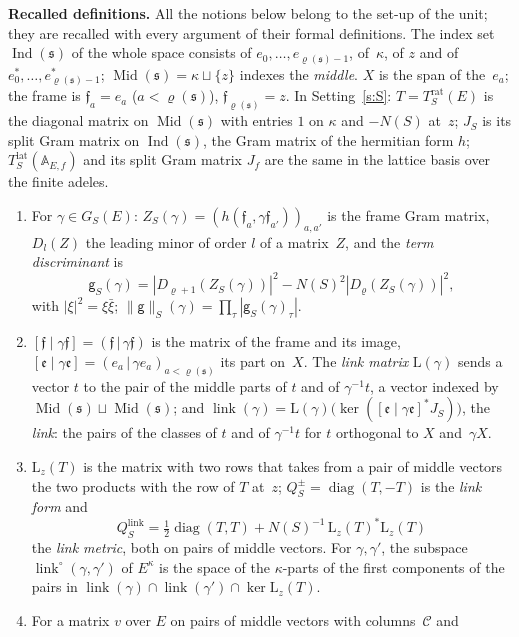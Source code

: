 \documentclass[11pt,a4paper]{article}
\newcommand{\diag}{\operatorname{diag}}
\newcommand{\m}[1]{\mbox{$#1$}}        %
\newcommand{\subhead}[1]{\par\addvspace{9pt plus 2pt}\Needspace{4\baselineskip}\noindent\textbf{#1}\enspace\ignorespaces}
\theoremstyle{plainx}
\theoremstyle{uprightx}
\newcommand{\fs}{\mathfrak{s}}                      %
\newcommand{\AEf}{\mathbb{A}_{E,f}}
\newcommand{\rh}[1]{\varrho(#1)}                    %
\newcommand{\Ix}[1]{\operatorname{Ind}(#1)}                          %
\newcommand{\Mx}[1]{\operatorname{Mid}(#1)}                          %
\newcommand{\NS}[1]{N(#1)}                          %
\newcommand{\Trat}[2]{T^{\mathrm{rat}}_{#1}(#2)}    %
\newcommand{\Tlat}[2]{T^{\mathrm{lat}}_{#1}(#2)}    %
\newcommand{\GS}[2]{G_{#1}(#2)}                     %
\newcommand{\Zf}[2]{Z_{#1}(#2)}                     %
\newcommand{\tdisc}[2]{\mathsf{g}_{#1}(#2)}         %
\newcommand{\link}[1]{\operatorname{link}(#1)}      %
\newcommand{\clink}[2]{\operatorname{link}^{\circ}(#1,#2)} %
\newcommand{\tdnorm}[2]{\|\mathsf{g}\|_{#1}(#2)}    %
\newcommand{\lmet}[1]{Q^{\mathrm{link}}_{#1}}       %
\newcommand{\Jrat}[1]{J_{#1}}                         %
\newcommand{\fpair}[1]{[\mathfrak{f}\mid #1\mathfrak{f}]}   %
\newcommand{\ifp}[1]{[\mathfrak{e}\mid #1\mathfrak{e}]}     %
\newcommand{\lmat}[1]{\mathrm{L}(#1)}                 %
\newcommand{\zp}[1]{\mathrm{L}_{z}(#1)}               %
\newcommand{\lform}[1]{Q^{\pm}_{#1}}                  %
\newcommand{\lminor}[2]{D_{#2}(#1)}                   %
\begin{document}
\subhead{Recalled definitions.} All the notions below belong to the set-up of the unit; they are recalled with
every argument of their formal definitions. The index set \m{\Ix{\fs}} of the whole space consists of
\m{e_0,\dots,e_{\rh{\fs}-1}}, of~$\kappa$, of $z$ and of \m{e^*_0,\dots,e^*_{\rh{\fs}-1}}; \m{\Mx{\fs}=\kappa\sqcup\{z\}}
indexes the \emph{middle}. $X$ is the span of the~$e_a$; the frame is \m{\mathfrak f_a=e_a} (\m{a<\rh{\fs}}),
\m{\mathfrak f_{\rh{\fs}}=z}. In Setting~\ref{s:S}: \m{T=\Trat{S}{E}} is the diagonal matrix on \m{\Mx{\fs}} with
entries $1$ on $\kappa$ and \m{-\NS{S}} at~$z$; \m{\Jrat{S}} is its split Gram matrix on \m{\Ix{\fs}}, the Gram
matrix of the hermitian form $h$; \m{\Tlat{S}{\AEf}} and its split Gram matrix $J_f$ are the same in the lattice
basis over the finite adeles.
\begin{enumerate}[label=\textup{(\alph*)},leftmargin=2.3em,itemsep=2pt]
\item For \m{\gamma\in\GS{S}{E}}: $\Zf{S}{\gamma}=(h(\mathfrak f_a,\gamma\mathfrak f_{a'}))_{a,a'}$ is the frame Gram
matrix, \m{\lminor{Z}{l}} the leading minor of order $l$ of a matrix~$Z$, and the \emph{term discriminant} is
\[\tdisc{S}{\gamma}=|\lminor{\Zf{S}{\gamma}}{\varrho+1}|^2-\NS{S}^2|\lminor{\Zf{S}{\gamma}}{\varrho}|^2,\]
with \m{|\xi|^2=\xi\bar\xi}; \m{\tdnorm{S}{\gamma}=\prod_\tau|\tdisc{S}{\gamma}_\tau|}.
\item \m{\fpair{\gamma}=(\mathfrak f\,|\,\gamma\mathfrak f)} is the matrix of the frame and its image,
\m{\ifp{\gamma}=(e_a\,|\,\gamma e_a)_{a<\rh{\fs}}} its part on~$X$. The \emph{link matrix} \m{\lmat{\gamma}} sends a
vector $t$ to the pair of the middle parts of $t$ and of \m{\gamma^{-1}t}, a vector indexed by
\m{\Mx{\fs}\sqcup\Mx{\fs}}; and \m{\link{\gamma}=\lmat{\gamma}\bigl(\ker(\ifp{\gamma}^*\Jrat{S})\bigr)}, the
\emph{link}: the pairs of the classes of $t$ and of $\gamma^{-1}t$ for $t$ orthogonal to $X$ and~$\gamma X$.
\item \m{\zp{T}} is the matrix with two rows that takes from a pair of middle vectors the two products with
the row of $T$ at~$z$; \m{\lform{S}=\diag(T,-T)} is the \emph{link form} and
\[\lmet{S}=\tfrac12\diag(T,T)+\NS{S}^{-1}\,\zp{T}^*\zp{T}\]
the \emph{link metric}, both on pairs of middle vectors. For \m{\gamma,\gamma'}, the subspace
\m{\clink{\gamma}{\gamma'}} of $E^\kappa$ is the space of the $\kappa$-parts of the first components of the
pairs in $\link{\gamma}\cap\link{\gamma'}\cap\ker\zp{T}$.
\item For a matrix $v$ over $E$ on pairs of middle vectors with columns~$\mathcal C$ and

\end{enumerate}
\end{document}
